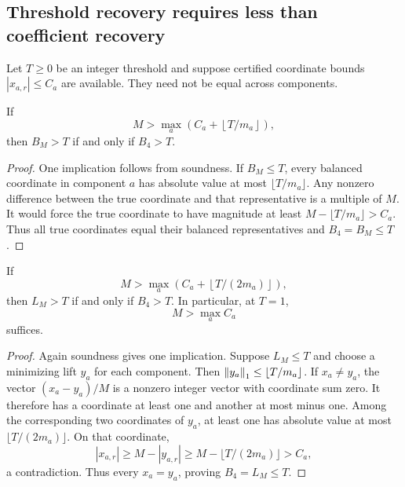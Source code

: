 \subsection{Threshold recovery requires less than coefficient recovery}

Let $T\ge0$ be an integer threshold and suppose certified coordinate bounds
$|x_{a,r}|\le C_a$ are available. They need not be equal across components.

\begin{theorem}
\label{thm:balanced-complete}
If
\[
       M>\max_a\left(C_a+\left\lfloor T/m_a\right\rfloor\right),
\]
then $B_M>T$ if and only if $B_4>T$.
\end{theorem}
\begin{proof}
One implication follows from soundness. If $B_M\le T$, every balanced
coordinate in component $a$ has absolute value at most $\lfloor T/m_a\rfloor$.
Any nonzero difference between the true coordinate and that representative is
a multiple of $M$. It would force the true coordinate to have magnitude at
least $M-\lfloor T/m_a\rfloor>C_a$. Thus all true coordinates equal their
balanced representatives and $B_4=B_M\le T$.
\end{proof}

\begin{theorem}
\label{thm:sum-complete}
If
\begin{equation}
       M>\max_a\left(C_a+\left\lfloor T/(2m_a)\right\rfloor\right),
 \label{eq:sharp-threshold}
\end{equation}
then $L_M>T$ if and only if $B_4>T$. In particular, at $T=1$,
\begin{equation}
                     M>\max_a C_a
 \label{eq:threshold-one}
\end{equation}
suffices.
\end{theorem}
\begin{proof}
Again soundness gives one implication. Suppose $L_M\le T$ and choose a
minimizing lift $y_a$ for each component. Then
$\left\lVert y_a\right\rVert_1\le\lfloor T/m_a\rfloor$. If $x_a\ne y_a$, the vector
$(x_a-y_a)/M$ is a nonzero integer vector with coordinate sum zero. It therefore
has a coordinate at least one and another at most minus one. Among the
corresponding two coordinates of $y_a$, at least one has absolute value at
most $\lfloor T/(2m_a)\rfloor$. On that coordinate,
\[
 |x_{a,r}|\ge M-|y_{a,r}|
             \ge M-\lfloor T/(2m_a)\rfloor>C_a,
\]
a contradiction. Thus every $x_a=y_a$, proving $B_4=L_M\le T$.
\end{proof}

